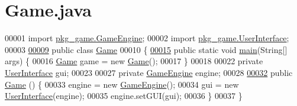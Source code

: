 \hypertarget{Game_8java_source}{\section{Game.\-java}
}

\begin{DoxyCode}
00001 \textcolor{keyword}{import} \hyperlink{classpkg__game_1_1GameEngine}{pkg\_game.GameEngine};
00002 \textcolor{keyword}{import} \hyperlink{classpkg__game_1_1UserInterface}{pkg\_game.UserInterface};
00003 
\hypertarget{Game_8java_source_l00009}{}\hyperlink{classGame}{00009} \textcolor{keyword}{public} \textcolor{keyword}{class }\hyperlink{classGame}{Game}
00010 \{
\hypertarget{Game_8java_source_l00015}{}\hyperlink{classGame_ae52595a27ac1b327b05db2129ad81fca}{00015}     \textcolor{keyword}{public} \textcolor{keyword}{static} \textcolor{keywordtype}{void} \hyperlink{classGame_ae52595a27ac1b327b05db2129ad81fca}{main}(String[] args) \{
00016         \hyperlink{classGame}{Game} game = \textcolor{keyword}{new} \hyperlink{classGame_a2e034e53e9c032964ecd2a831b29a616}{Game}();
00017     \}
00018 
00022     \textcolor{keyword}{private} \hyperlink{classpkg__game_1_1UserInterface}{UserInterface} gui;
00023 
00027     \textcolor{keyword}{private} \hyperlink{classpkg__game_1_1GameEngine}{GameEngine} engine;
00028 
\hypertarget{Game_8java_source_l00032}{}\hyperlink{classGame_a2e034e53e9c032964ecd2a831b29a616}{00032}     \textcolor{keyword}{public} \hyperlink{classGame_a2e034e53e9c032964ecd2a831b29a616}{Game} () \{
00033         engine = \textcolor{keyword}{new} \hyperlink{classpkg__game_1_1GameEngine}{GameEngine}();
00034         gui = \textcolor{keyword}{new} \hyperlink{classpkg__game_1_1UserInterface}{UserInterface}(engine);
00035         engine.setGUI(gui);
00036     \}
00037 \}
\end{DoxyCode}
